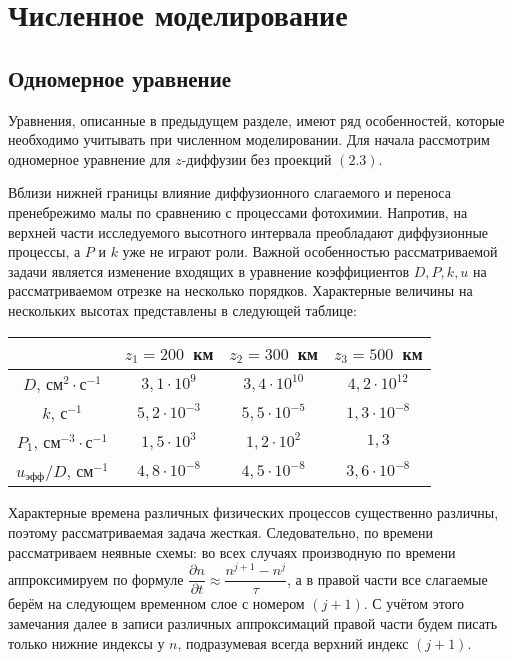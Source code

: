 \documentclass[14pt, a4paper, fleqn]{extarticle}
\begin{document}
\newpage

\section{Численное моделирование}

\subsection{Одномерное уравнение}

Уравнения, описанные в предыдущем разделе, имеют ряд особенностей, которые необходимо учитывать при численном моделировании. Для начала рассмотрим одномерное уравнение для $z$-диффузии без проекций $(2.3)$.

Вблизи нижней границы влияние диффузионного слагаемого и переноса пренебрежимо малы по сравнению с процессами фотохимии. Напротив, на верхней части исследуемого высотного интервала преобладают диффузионные процессы, а $P$ и $k$ уже не играют роли. Важной особенностью рассматриваемой задачи является изменение входящих в уравнение коэффициентов $D, P, k, u$ на рассматриваемом отрезке на несколько порядков. Характерные величины на нескольких высотах представлены в следующей таблице: 

\smallskip

\begin{tabular}{|c|c|c|c|}
\hline
&$z_1=200$~км&$z_2=300$~км&$z_3=500$~км\\
\hline
$D$, см$^{2}\cdot$с$^{-1}$&$3{,}1\cdot 10^9$&$3{,}4\cdot 10^{10}$&$4{,}2\cdot 10^{12}$\\
\hline
$k$, с$^{-1}$&$5{,}2\cdot 10^{-3}$&$5{,}5\cdot 10^{-5}$&$1{,}3\cdot 10^{-8}$\\
\hline
$P_1$, см$^{-3}\cdot$с$^{-1}$&$1{,}5\cdot 10^3$&$1{,}2\cdot 10^{2}$&$1{,}3$\\
\hline
$u_\textrm{эфф}/D$, см$^{-1}$&$4{,}8\cdot 10^{-8}$&$4{,}5\cdot 10^{-8}$&$3{,}6\cdot 10^{-8}$\\
\hline
\end{tabular}

\medskip 

Характерные времена различных физических процессов существенно различны, поэтому рассматриваемая задача жесткая. Следовательно, по времени рассматриваем неявные схемы: во всех случаях производную по времени аппроксимируем по формуле $\dfrac{\partial n}{\partial t}\approx \dfrac{n^{j+1}-n^j}{\tau}$, а в правой части все слагаемые берём на следующем временном слое с номером $(j+1)$. С учётом этого замечания далее в записи различных аппроксимаций правой части будем писать только нижние индексы у $n$, подразумевая всегда верхний индекс $(j+1)$.
\end{document}
